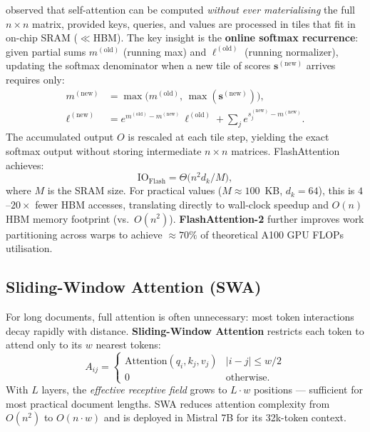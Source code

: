 \documentclass[11pt,a4paper]{article}
\begin{document}
	\textcite{dao2022flashattention} observed that self-attention can be computed \emph{without ever materialising} the full $n \times n$ matrix, provided keys, queries, and values are processed in tiles that fit in on-chip SRAM ($\ll$HBM). The key insight is the \textbf{online softmax recurrence}: given partial sums $m^{(\mathrm{old})}$ (running max) and $\ell^{(\mathrm{old})}$ (running normalizer), updating the softmax denominator when a new tile of scores $\mathbf{s}^{(\mathrm{new})}$ arrives requires only:
	\begin{align}
		m^{(\mathrm{new})} &= \max\bigl(m^{(\mathrm{old})},\, \max(\mathbf{s}^{(\mathrm{new})})\bigr), \\
		\ell^{(\mathrm{new})} &= e^{m^{(\mathrm{old})} - m^{(\mathrm{new})}}\,\ell^{(\mathrm{old})} + \sum_j e^{s^{(\mathrm{new})}_j - m^{(\mathrm{new})}}.
	\end{align}
	The accumulated output $O$ is rescaled at each tile step, yielding the exact softmax output without storing intermediate $n \times n$ matrices. FlashAttention achieves:
	\begin{equation}
		\mathrm{IO}_{\mathrm{Flash}} = \Theta\!\bigl(n^2 d_k / M\bigr),
	\end{equation}
	where $M$ is the SRAM size. For practical values ($M \approx 100$~KB, $d_k = 64$), this is $4$--$20\times$ fewer HBM accesses, translating directly to wall-clock speedup and $O(n)$ HBM memory footprint (vs.\ $O(n^2)$). \textbf{FlashAttention-2} \parencite{dao2023flashattention2} further improves work partitioning across warps to achieve $\approx 70\%$ of theoretical A100 GPU FLOPs utilisation.

	\subsection{Sliding-Window Attention (SWA)}

	For long documents, full attention is often unnecessary: most token interactions decay rapidly with distance. \textbf{Sliding-Window Attention} restricts each token to attend only to its $w$ nearest tokens:
	\begin{equation}
		A_{ij} = \begin{cases} \mathrm{Attention}(q_i, k_j, v_j) & |i - j| \le w/2 \\ 0 & \text{otherwise.} \end{cases}
	\end{equation}
	With $L$ layers, the \emph{effective receptive field} grows to $L \cdot w$ positions --- sufficient for most practical document lengths. SWA reduces attention complexity from $O(n^2)$ to $O(n \cdot w)$ and is deployed in Mistral 7B \parencite{jiang2023mistral} for its 32k-token context.
\end{document}
